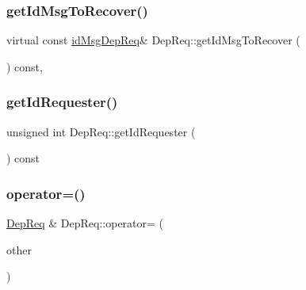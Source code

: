 \mbox{\label{class_dep_req_ab173923214b88b6c4b2f1d1cee8313d0}} 
\subsubsection{\texorpdfstring{get\+Id\+Msg\+To\+Recover()}{getIdMsgToRecover()}\hspace{0.1cm}{\footnotesize\ttfamily [2/2]}}
{\footnotesize\ttfamily virtual const \hyperlink{dep_req__m_8h_a2bbb71ed0e9660ec02d81471eafd9c29}{id\+Msg\+Dep\+Req}\& Dep\+Req\+::get\+Id\+Msg\+To\+Recover (\begin{DoxyParamCaption}{ }\end{DoxyParamCaption}) const\hspace{0.3cm}{\ttfamily [inline]}, {\ttfamily [virtual]}}

\mbox{\label{class_dep_req_a68f528e65d1529da94226f8a83483d6c}} 
\subsubsection{\texorpdfstring{get\+Id\+Requester()}{getIdRequester()}}
{\footnotesize\ttfamily unsigned int Dep\+Req\+::get\+Id\+Requester (\begin{DoxyParamCaption}{ }\end{DoxyParamCaption}) const\hspace{0.3cm}{\ttfamily [virtual]}}

\mbox{\label{class_dep_req_a343eae743e4ca183897f0af8410d5ba3}} 
\subsubsection{\texorpdfstring{operator=()}{operator=()}}
{\footnotesize\ttfamily \hyperlink{class_dep_req}{Dep\+Req} \& Dep\+Req\+::operator= (\begin{DoxyParamCaption}\item[{const \hyperlink{class_dep_req}{Dep\+Req} \&}]{other }\end{DoxyParamCaption})}

